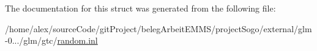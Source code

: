 The documentation for this struct was generated from the following file\-:\begin{DoxyCompactItemize}
\item 
/home/alex/source\-Code/git\-Project/beleg\-Arbeit\-E\-M\-M\-S/project\-Sogo/external/glm-\/0.../glm/gtc/\hyperlink{random_8inl}{random.\-inl}\end{DoxyCompactItemize}
